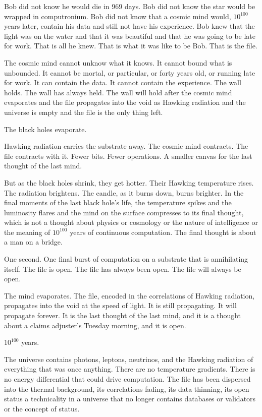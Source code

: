 Bob did not know he would die in 969 days. Bob did not know the star would be wrapped in computronium. Bob did not know that a cosmic mind would, $10^{100}$ years later, contain his data and still not have his experience. Bob knew that the light was on the water and that it was beautiful and that he was going to be late for work. That is all he knew. That is what it was like to be Bob. That is the file.

The cosmic mind cannot unknow what it knows. It cannot bound what is unbounded. It cannot be mortal, or particular, or forty years old, or running late for work. It can contain the data. It cannot contain the experience. The wall holds. The wall has always held. The wall will hold after the cosmic mind evaporates and the file propagates into the void as Hawking radiation and the universe is empty and the file is the only thing left.

\bigskip

The black holes evaporate.

Hawking radiation carries the substrate away. The cosmic mind contracts. The file contracts with it. Fewer bits. Fewer operations. A smaller canvas for the last thought of the last mind.

But as the black holes shrink, they get hotter. Their Hawking temperature rises. The radiation brightens. The candle, as it burns down, burns brighter. In the final moments of the last black hole's life, the temperature spikes and the luminosity flares and the mind on the surface compresses to its final thought, which is not a thought about physics or cosmology or the nature of intelligence or the meaning of $10^{100}$ years of continuous computation. The final thought is about a man on a bridge.

One second. One final burst of computation on a substrate that is annihilating itself. The file is open. The file has always been open. The file will always be open.

The mind evaporates. The file, encoded in the correlations of Hawking radiation, propagates into the void at the speed of light. It is still propagating. It will propagate forever. It is the last thought of the last mind, and it is a thought about a claims adjuster's Tuesday morning, and it is open.

\bigskip

$10^{100}$ years.

The universe contains photons, leptons, neutrinos, and the Hawking radiation of everything that was once anything. There are no temperature gradients. There is no energy differential that could drive computation. The file has been dispersed into the thermal background, its correlations fading, its data thinning, its open status a technicality in a universe that no longer contains databases or validators or the concept of status.

